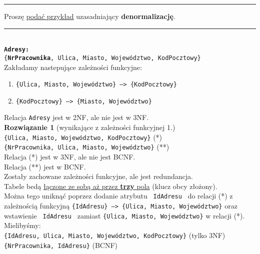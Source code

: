 \documentclass[a5paper,6pt]{article}
\newcommand{\horrule}[1]{\rule{\linewidth}{#1}}
\begin{document}
\pagebreak

    \horrule{0.5pt}
    Proszę \underline{podać przykład} uzasadniający \textbf{denormalizację}.\\
    \horrule{0.5pt}\\

    \texttt{\textbf{Adresy:}\\
    \{\textbf{{\color{green}\faKey}NrPracownika}, Ulica, Miasto,
    Województwo, KodPocztowy\}}\\

    Zakładamy nastepujące zależności funkcyjne:
    \begin{enumerate}
        \item \texttt{\{Ulica, Miasto, Województwo\} --> \{KodPocztowy\}}
        \item \texttt{\{KodPocztowy\} --> \{Miasto, Województwo\}}
    \end{enumerate}

    Relacja \texttt{Adresy} jest w 2NF, ale nie jest w 3NF.\\

    \textbf{Rozwiązanie 1} (wynikające z zależności funkcyjnej 1.)\\

    \texttt{\{{\color{green}\faKey}{\color{blue}\faKey}Ulica,
    {\color{green}\faKey}Miasto, {\color{green}\faKey}Województwo,
    {\color{blue}\faKey}KodPocztowy\}} (*)\\
    \texttt{\{{\color{green}\faKey}NrPracownika, Ulica, Miasto, Województwo\}}
    (**)\\

    Relacja (*) jest w 3NF, ale nie jest BCNF.\\
    Relacja (**) jest w BCNF.\\

    Zostały zachowane zależności funkcyjne, ale jest redundancja.\\
    Tabele bedą \underline{łączone ze sobą aż przez \textbf{trzy} pola}
    (klucz obcy złożony).\\
    Można tego uniknąć poprzez dodanie atrybutu \texttt{ IdAdresu } do
    relacji (*) z zależnością funkcyjną \texttt{\{IdAdresu\} --> \{Ulica,
    Miasto, Województwo\}} oraz wstawienie \texttt{ IdAdresu } zamiast
    \texttt{\{Ulica, Miasto, Województwo\}} w relacji (*). Mielibyśmy:\\

    \texttt{\{{\color{red}\faKey}IdAdresu,
    {\color{green}\faKey}{\color{blue}\faKey}Ulica,
    {\color{green}\faKey}Miasto, {\color{green}\faKey}Województwo,
    {\color{green}\faKey}KodPocztowy\}}
    (tylko 3NF)\\
    \texttt{\{{\color{green}\faKey}NrPracownika, IdAdresu\}} (BCNF)\\
\end{document}
